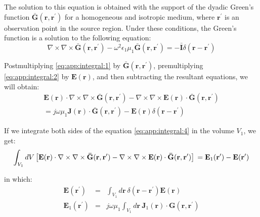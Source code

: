 		The solution to this equation is obtained with the support of the dyadic Green's function $\mathbf{\bar{G}}(\mathbf{r},\mathbf{r^\prime})$ for a homogeneous and isotropic medium, where $\mathbf{r^\prime}$ is an observation point in the source region. Under these conditions, the Green's function is a solution to the following equation:
		\begin{equation}
			\nabla\times\nabla\times\mathbf{\bar{G}}(\mathbf{r}, \mathbf{r^\prime}) - \omega^2\epsilon_1\mu_1\mathbf{\bar{G}}(\mathbf{r}, \mathbf{r^\prime}) = -\mathbf{\bar{I}}\delta(\mathbf{r}-\mathbf{r^\prime}) \label{eq:app:integral:2}
		\end{equation}

		Postmultiplying \eqref{eq:app:integral:1} by $\mathbf{\bar{G}}(\mathbf{r}, \mathbf{r^\prime})$, premultiplying \eqref{eq:app:integral:2} by $\mathbf{E}(\mathbf{r})$, and then subtracting the resultant equations, we will obtain:
		\begin{eqnarray}
			\mathbf{E}(\mathbf{r})\cdot\nabla\times\nabla\times\mathbf{\bar{G}}(\mathbf{r},\mathbf{r^\prime}) - 	\nabla\times\nabla\times\mathbf{E}(\mathbf{r})\cdot\mathbf{\bar{G}}(\mathbf{r},\mathbf{r^\prime}) \nonumber \\ = j\omega\mu_1\mathbf{J}(\mathbf{r})\cdot\mathbf{\bar{G}}(\mathbf{r},\mathbf{r^\prime}) - \mathbf{E}(\mathbf{r})\delta(\mathbf{r}-\mathbf{r^\prime}) \label{eq:app:integral:4}
		\end{eqnarray}

		If we integrate both sides of the equation \eqref{eq:app:integral:4}  in the volume $V_1$, we get:
		\begin{equation}
			\int_{V_1} dV\left[\mathbf{E}(\mathbf{r})\cdot\nabla\times\nabla\times\mathbf{\bar{G}}(\mathbf{r},\mathbf{r^\prime})-\nabla\times\nabla\times\mathbf{E}(\mathbf{r})\cdot\mathbf{\bar{G}}(\mathbf{r},\mathbf{r^\prime})\right] \nonumber \\ = \mathbf{E}_1(\mathbf{r^\prime}) - \mathbf{E}(\mathbf{r^\prime}) \label{eq:app:integral:5}
		\end{equation}

		\noindent in which:
		\begin{eqnarray}
			\mathbf{E}(\mathbf{r^\prime}) &=& \int_{V_1} d\mathbf{r}~\delta(\mathbf{r}-\mathbf{r^\prime})\mathbf{E}(\mathbf{r}) \label{eq:app:integral:6} \\
			\mathbf{E}_1(\mathbf{r^\prime}) &=& j\omega\mu_1\int_{V_1} d\mathbf{r}~\mathbf{J}_1(\mathbf{r})\cdot\mathbf{G}(\mathbf{r},\mathbf{r^\prime}) \label{eq:app:integral:7} 
		\end{eqnarray}
	
